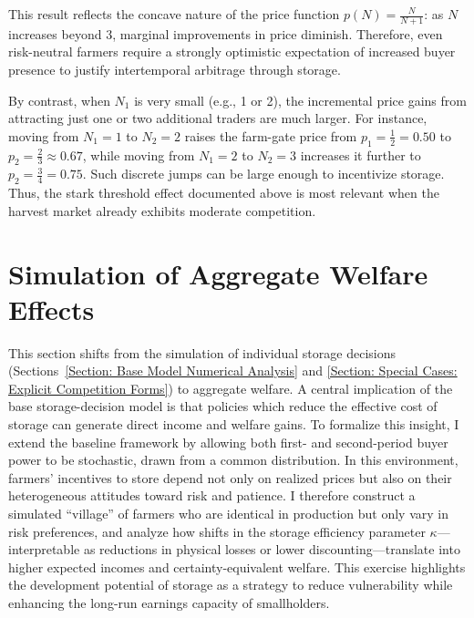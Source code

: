 This result reflects the concave nature of the price function $p(N) = \tfrac{N}{N+1}$: as $N$ increases beyond 3, marginal improvements in price diminish. Therefore, even risk-neutral farmers require a strongly optimistic expectation of increased buyer presence to justify intertemporal arbitrage through storage. 

By contrast, when $N_1$ is very small (e.g., 1 or 2), the incremental price gains from attracting just one or two additional traders are much larger. For instance, moving from $N_1=1$ to $N_2=2$ raises the farm-gate price from $p_1=\tfrac{1}{2}=0.50$ to $p_2=\tfrac{2}{3}\approx 0.67$, while moving from $N_1=2$ to $N_2=3$ increases it further to $p_2=\tfrac{3}{4}=0.75$. Such discrete jumps can be large enough to incentivize storage. Thus, the stark threshold effect documented above is most relevant when the harvest market already exhibits moderate competition.







\section{Simulation of Aggregate Welfare Effects}\label{subsec:agg_welfare}
\noindent
This section shifts from the simulation of individual storage decisions (Sections~\ref{Section: Base Model Numerical Analysis} and \ref{Section: Special Cases: Explicit Competition Forms}) to aggregate welfare. A central implication of the base storage-decision model is that policies which reduce the effective cost of storage can generate direct income and welfare gains. To formalize this insight, I extend the baseline framework by allowing both first- and second-period buyer power to be stochastic, drawn from a common distribution. In this environment, farmers’ incentives to store depend not only on realized prices but also on their heterogeneous attitudes toward risk and patience. I therefore construct a simulated “village” of farmers who are identical in production but only vary in risk preferences, and analyze how shifts in the storage efficiency parameter $\kappa$---interpretable as reductions in physical losses or lower discounting---translate into higher expected incomes and certainty-equivalent welfare. This exercise highlights the development potential of storage as a strategy to reduce vulnerability while enhancing the long-run earnings capacity of smallholders.




